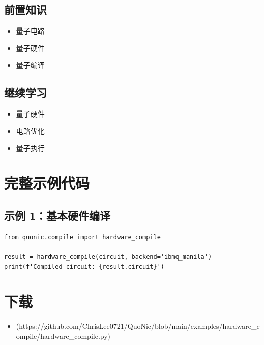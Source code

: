 \documentclass[12pt,a4paper]{article}
\begin{document}
\subsection{前置知识}
\begin{itemize}
  \item 量子电路
  \item 量子硬件
  \item 量子编译
\end{itemize}

\subsection{继续学习}
\begin{itemize}
  \item 量子硬件
  \item 电路优化
  \item 量子执行
\end{itemize}

\section{完整示例代码}

\subsection{示例 1：基本硬件编译}

\begin{verbatim}
from quonic.compile import hardware_compile

result = hardware_compile(circuit, backend='ibmq_manila')
print(f'Compiled circuit: {result.circuit}')
\end{verbatim}

\section{下载}

\begin{itemize}
  \item [hardware\_compile.py](https://github.com/ChrisLee0721/QuoNic/blob/main/examples/hardware_compile/hardware_compile.py)
\end{itemize}
\end{document}
